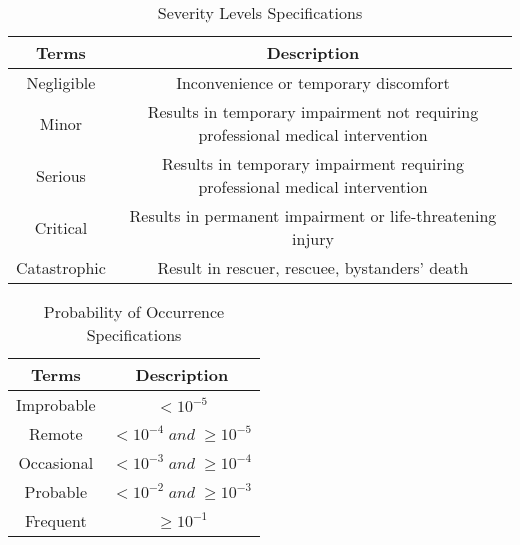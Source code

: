 \documentclass{article}[10pt]
\begin{document}
\begin{table}[h!]
    \begin{center}
    \begin{tabular}{|c|c|}
        \hline
        Terms&Description\\
        \hline
        Negligible&Inconvenience or temporary discomfort\\
        \hline
        Minor  &Results in temporary impairment not requiring professional medical intervention\\
        \hline
        Serious&Results in temporary impairment requiring professional medical intervention\\
        \hline
        Critical&Results in permanent impairment or life-threatening injury\\
        \hline
        Catastrophic&Result in rescuer, rescuee, bystanders’ death\\
        \hline
    \end{tabular}
    \caption{Severity Levels Specifications}
    \label{tab:Figure}
\end{center}
\end{table}

\begin{table}[H]
    \begin{center}
    \begin{tabular}{|c|c|}
        \hline
        Terms&Description\\
        \hline
        Improbable&$<10^{-5}$\\
        \hline
        Remote&$<10^{-4}\; and \; \geq 10^{-5}$\\
        \hline
        Occasional&$<10^{-3} \;and \;\geq 10^{-4}$\\
        \hline
        Probable&$<10^{-2} \; and\; \geq 10^{-3}$\\
        \hline
        Frequent&$\geq 10^{-1}$\\
        \hline
    \end{tabular}
    \caption{Probability of Occurrence Specifications}
    \label{tab:Figure}
\end{center}
\end{table}    
\end{document}
